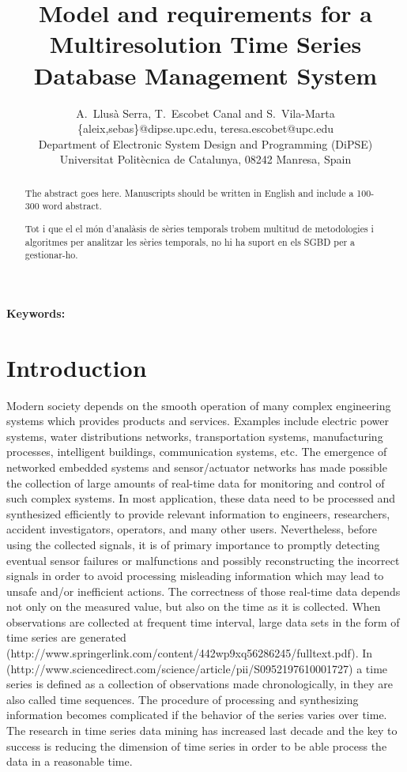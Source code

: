 \documentclass{scrartcl}
\title{
  Model and requirements for a Multiresolution Time Series
  Database Management System }
\author
{
  {
    A.\ Llusà Serra,
    T.\ Escobet Canal
    and S.\ Vila-Marta
  }\\
  {\{aleix,sebas\}@dipse.upc.edu, teresa.escobet@upc.edu}\\
  {Department of Electronic System Design and Programming (DiPSE)}\\
  {Universitat Politècnica de Catalunya, 08242 Manresa, Spain}
}
\begin{document}
\maketitle


\begin{abstract}
The abstract goes here.
Manuscripts should be written in English and include a 100-300 word abstract.

Tot i que el el món d'analàsis de sèries temporals trobem multitud de metodologies i algoritmes per analitzar les sèries temporals, no hi ha suport en els SGBD per a gestionar-ho.
\end{abstract}

{\bfseries Keywords:} 







\section{Introduction}



Modern society depends on the smooth operation of many complex
engineering systems which provides products and services. Examples
include electric power systems, water distributions networks,
transportation systems, manufacturing processes, intelligent
buildings, communication systems, etc. The emergence of networked
embedded systems and sensor/actuator networks has made possible the
collection of large amounts of real-time data for monitoring and
control of such complex systems.  In most application, these data need
to be processed and synthesized efficiently to provide relevant
information to engineers, researchers, accident investigators,
operators, and many other users. Nevertheless, before using the
collected signals, it is of primary importance to promptly detecting
eventual sensor failures or malfunctions and possibly reconstructing
the incorrect signals in order to avoid processing misleading
information which may lead to unsafe and/or inefficient actions. The
correctness of those real-time data depends not only on the measured
value, but also on the time as it is collected. When observations are
collected at frequent time interval, large data sets in the form of
time series are generated
(http://www.springerlink.com/content/442wp9xq56286245/fulltext.pdf). In
(http://www.sciencedirect.com/science/article/pii/S0952197610001727) a
time series is defined as a collection of observations made
chronologically, in \cite{last:hetland} they are also called time
sequences.  The procedure of processing and synthesizing information
becomes complicated if the behavior of the series varies over time.
The research in time series data mining has increased last decade and
the key to success is reducing the dimension of time series in order
to be able process the data in a reasonable time.
\end{document}
